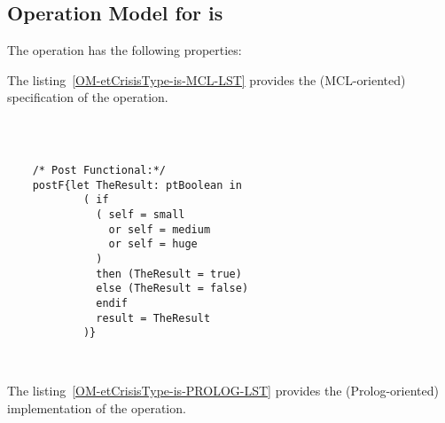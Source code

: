 \subsection{Operation Model for is}

\label{OM-is}


The  operation has the following properties:

	\begin{operationmodel}



		


	\end{operationmodel}



	\vspace{1cm}
	The listing~\ref{OM-etCrisisType-is-MCL-LST} provides the \msrmessir (MCL-oriented) specification of the operation.
	
	\scriptsize
	\vspace{0.5cm}
	\begin{lstlisting}[style=MessirStyle,firstnumber=auto,captionpos=b,caption={\msrmessir (MCL-oriented) specification of the operation \emph{is}.},label=OM-etCrisisType-is-MCL-LST]

	
	
	/* Post Functional:*/ 
	postF{let TheResult: ptBoolean in
	        ( if
	          ( self = small
	            or self = medium
	            or self = huge
	          )
	          then (TheResult = true)
	          else (TheResult = false)
	          endif
	          result = TheResult
	        )}
	
	
	\end{lstlisting}
	\normalsize 
	
	
	
	
	
	\vspace{1cm}
	The listing~\ref{OM-etCrisisType-is-PROLOG-LST} provides the \msrmessir (Prolog-oriented) implementation of the operation.
	
	\scriptsize
	\vspace{0.5cm}
	
	
	\normalsize





